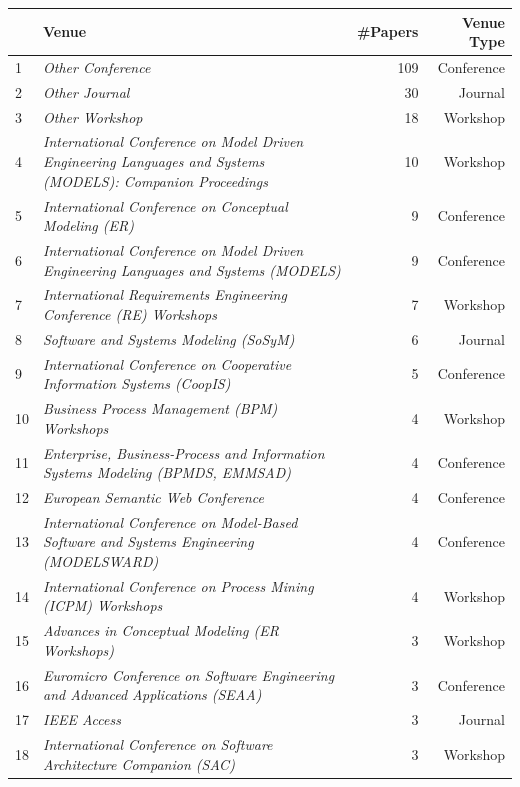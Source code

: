 \begin{tabular} { l p{} r r} \\ 
\toprule 
 & Venue &  \#Papers & Venue Type \\ 
\midrule  
1 & \emph{Other Conference} & 109 & Conference\\ 
2 & \emph{Other Journal} & 30 & Journal\\ 
3 & \emph{Other Workshop} & 18 & Workshop\\ 
4 & \emph{International Conference on Model Driven Engineering Languages and Systems (MODELS): Companion Proceedings} & 10 & Workshop\\ 
5 & \emph{International Conference on Conceptual Modeling (ER)} & 9 & Conference\\ 
6 & \emph{International Conference on Model Driven Engineering Languages and Systems (MODELS)} & 9 & Conference\\ 
7 & \emph{International Requirements Engineering Conference (RE) Workshops} & 7 & Workshop\\ 
8 & \emph{Software and Systems Modeling (SoSyM)} & 6 & Journal\\ 
9 & \emph{International Conference on Cooperative Information Systems (CoopIS)} & 5 & Conference\\ 
10 & \emph{Business Process Management (BPM) Workshops} & 4 & Workshop\\ 
11 & \emph{Enterprise, Business-Process and Information Systems Modeling (BPMDS, EMMSAD)} & 4 & Conference\\ 
12 & \emph{European Semantic Web Conference} & 4 & Conference\\ 
13 & \emph{International Conference on Model-Based Software and Systems Engineering (MODELSWARD)} & 4 & Conference\\ 
14 & \emph{International Conference on Process Mining (ICPM) Workshops} & 4 & Workshop\\ 
15 & \emph{Advances in Conceptual Modeling (ER Workshops)} & 3 & Workshop\\ 
16 & \emph{Euromicro Conference on Software Engineering and Advanced Applications (SEAA)} & 3 & Conference\\ 
17 & \emph{IEEE Access} & 3 & Journal\\ 
18 & \emph{International Conference on Software Architecture Companion (SAC)} & 3 & Workshop\\ 
\bottomrule 
\end{tabular} 
